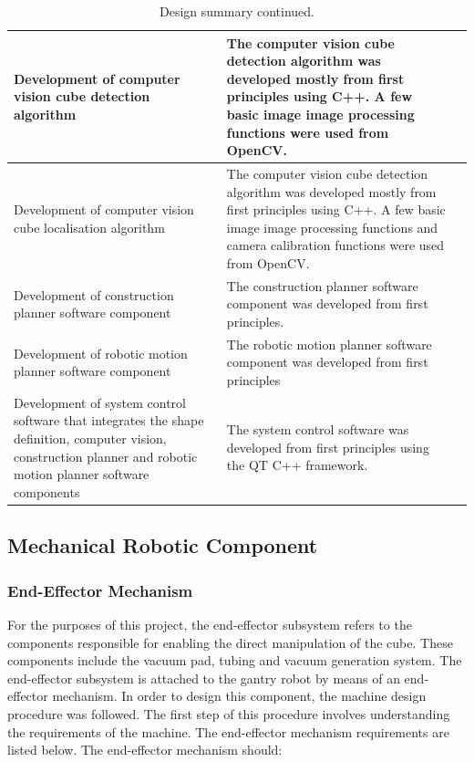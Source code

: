 \begin{table}[H]
	\renewcommand{\arraystretch}{1.3}
	\centering
	\begin{tabular}{|>{\raggedright}m{5cm}|>{\raggedright}m{4cm}|>{\raggedright\arraybackslash}m{4cm}|}
		\hline
		Development of computer vision cube detection algorithm & The computer vision cube detection algorithm was developed mostly from first principles using C++. A few basic image image processing functions were used from OpenCV. & \\
		\hline
		Development of computer vision cube localisation algorithm & The computer vision cube detection algorithm was developed mostly from first principles using C++. A few basic image image processing functions and camera calibration functions were used from OpenCV. & \\
		\hline
		Development of construction planner software component & The construction planner software component was developed from first principles. & \\
		\hline
		Development of robotic motion planner software component & The robotic motion planner software component was developed from first principles & \\
		\hline
		Development of system control software that integrates the shape definition, computer vision, construction planner and robotic motion planner software components & The system control software was developed from first principles using the QT C++ framework. & \\
		\hline
	\end{tabular}
	\caption{\label{tab:design_summary_p2}Design summary continued.}
\end{table}

\subsection{Mechanical Robotic Component} \label{sec:Mechancial Robotic Component}

\subsubsection{End-Effector Mechanism}

For the purposes of this project, the end-effector subsystem refers to the components responsible for enabling the direct manipulation of the cube. These components include the vacuum pad, tubing and vacuum generation system. The end-effector subsystem is attached to the gantry robot by means of an end-effector mechanism. In order to design this component, the machine design procedure was followed. The first step of this procedure involves understanding the requirements of the machine. The end-effector mechanism requirements are listed below. The end-effector mechanism should:

